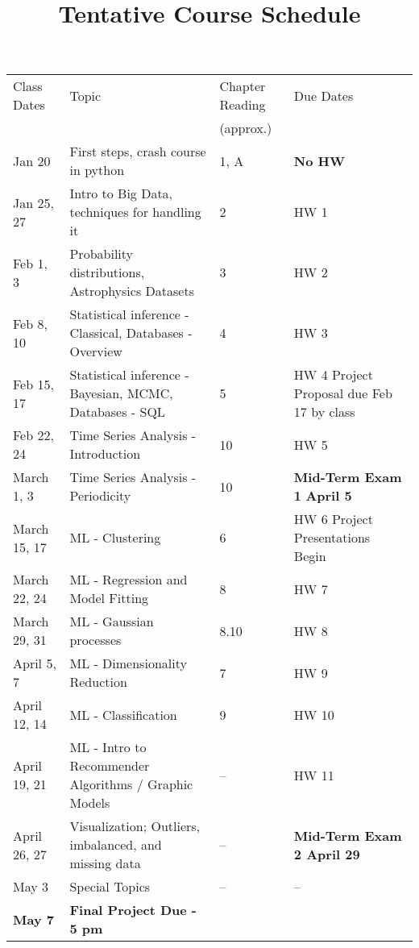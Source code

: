 \documentclass[12pt]{article}
\begin{document}
\begin{table}[h]
\small
\title{\bf \Large Tentative Course Schedule}
\centering
\begin{tabular}{|p{25mm}|p{70mm}|p{15mm}|p{35mm}|}
\hline
Class Dates & Topic & Chapter Reading  & Due Dates \\
 &  & (approx.)  & \\
\hline
Jan 20 & First steps, crash course in python & 1, A & {\bf No HW} \\
\hline
Jan 25, 27 & Intro to Big Data, techniques for handling it & 2 & HW 1 \\
 \hline
Feb 1, 3 & Probability distributions, Astrophysics Datasets   &  3  & HW 2 \\
 \hline
Feb 8, 10 & Statistical inference - Classical, Databases - Overview  &  4  & HW 3  \\
\hline
Feb 15, 17 & Statistical inference -Bayesian,  MCMC, Databases - SQL   &  5  & HW 4 \newline Project Proposal due Feb 17 by class \\
 \hline
Feb 22, 24 & Time Series Analysis - Introduction & 10  & HW 5 \\
 \hline
March 1, 3 & Time Series Analysis - Periodicity & 10  & {\bf Mid-Term Exam 1} {\bf April 5}  \\
 \hline
March 15, 17 & ML - Clustering & 6 & HW 6 \newline Project Presentations Begin \\
 \hline
March 22, 24 & ML - Regression and Model Fitting & 8 & HW 7  \\ 
 \hline
 March 29, 31 & ML - Gaussian processes  & 8.10 & HW 8 \\ 
 \hline
 April 5, 7 & ML - Dimensionality Reduction & 7 & HW 9 \\
 \hline 
April 12, 14 & ML - Classification & 9 & HW 10 \\
 \hline
April 19, 21 & ML - Intro to Recommender Algorithms / Graphic Models  & -- & HW 11 \\
 \hline
 April 26, 27 & Visualization; Outliers, imbalanced, and missing data  & -- & \bf Mid-Term Exam 2 {\bf April 29} \\
 \hline
May 3 & Special Topics & -- & -- \\
 \hline
{\bf May 7} & {\bf Final Project Due - 5 pm} & & ~\\ 
\hline
\end{tabular}
\label{tab:chisq}
\end{table}
\clearpage
\end{document}
